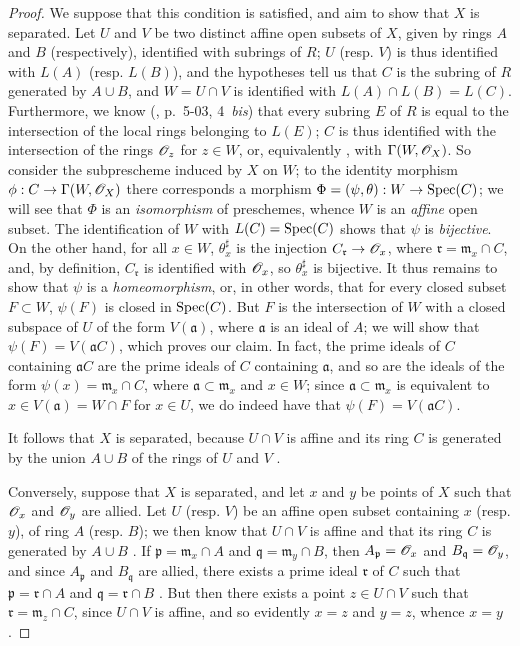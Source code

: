 \begin{proof}
\label{proof-I.8.2.2}
We suppose that this condition is satisfied, and aim to show that $X$ is separated.
Let $U$ and $V$ be two distinct affine open subsets of $X$, given by rings $A$ and $B$ (respectively), identified with subrings of $R$;
$U$ (resp. $V$) is thus identified  with $L(A)$ (resp. $L(B)$), and the hypotheses tell us  that $C$ is the subring of $R$ generated by $A\cup B$, and $W=U\cap V$ is identified with $L(A)\cap L(B)=L(C)$.
Furthermore, we know (\cite{I-1}, p.~5-03, 4~\emph{bis}) that every subring $E$ of $R$ is equal to the intersection of the local rings belonging to $L(E)$;
$C$ is thus identified with the intersection of the rings $\mathscr{O}_z$ for $z\in W$, or, equivalently , with $\Gamma(W,\mathscr{O}_X)$.
So consider the subprescheme induced by $X$ on $W$;
to the identity morphism $\vphi: C\to\Gamma(W,\sh{O}_X)$ there corresponds  a morphism $\Phi=(\psi,\theta):W\to\Spec(C)$;
we will see that $\Phi$ is an \emph{isomorphism} of preschemes, whence $W$ is an \emph{affine} open subset.
The identification of $W$ with $L(C)=\operatorname{Spec}(C)$ shows that $\psi$ is \emph{bijective}.
On the other hand, for all $x\in W$, $\theta_x^\sharp$ is the injection $C_\mathfrak{r}\to\sh{O}_x$, where $\mathfrak{r}=\mathfrak{m}_x\cap C$, and, by definition, $C_\mathfrak{r}$ is identified with $\mathscr{O}_x$, so $\theta_x^\sharp$ is bijective.
It thus remains to show that $\psi$ is a \emph{homeomorphism}, or, in other words, that for every closed subset $F\subset W$, $\psi(F)$ is closed in
$\operatorname{Spec}(C)$.
But $F$ is the intersection of $W$ with a closed subspace of $U$ of the form $V(\mathfrak{a})$, where $\mathfrak{a}$ is an ideal of $A$;
we will show that $\psi(F)=V(\mathfrak{a}C)$, which proves our claim.
In fact, the prime ideals of $C$ containing $\mathfrak{a}C$ are the prime ideals of $C$ containing $\mathfrak{a}$, and so are the ideals of the form $\psi(x)=\mathfrak{m}_x\cap C$, where $\mathfrak{a}\subset\mathfrak{m}_x$ and $x\in W$;
since $\mathfrak{a}\subset\mathfrak{m}_x$ is equivalent to $x\in V(\mathfrak{a})=W\cap F$ for $x\in U$, we do indeed have that $\psi(F)=V(\mathfrak{a}C)$.

It follows that $X$ is separated, because $U\cap V$ is affine and its ring $C$ is generated by the union $A\cup B$ of the rings of $U$ and $V$ .

Conversely, suppose that $X$ is separated, and let $x$ and $y$ be points of $X$ such that $\mathscr{O}_x$ and $\mathscr{O}_y$ are allied.
Let $U$ (resp. $V$) be an affine open subset containing $x$ (resp. $y$), of ring $A$ (resp. $B$);
we then know that $U\cap V$ is affine and that its ring $C$ is generated by $A\cup B$ .
If $\mathfrak{p}=\mathfrak{m}_x\cap A$ and $\mathfrak{q}=\mathfrak{m}_y\cap B$, then $A_\mathfrak{p}=\mathscr{O}_x$ and $B_\mathfrak{q}=\mathscr{O}_y$, and since $A_\mathfrak{p}$ and $B_\mathfrak{q}$ are allied, there exists a prime ideal $\mathfrak{r}$ of $C$ such that $\mathfrak{p}=\mathfrak{r}\cap A$ and $\mathfrak{q}=\mathfrak{r}\cap B$ .
But then there exists a point $z\in U\cap V$ such that $\mathfrak{r}=\mathfrak{m}_z\cap C$, since $U\cap V$ is affine, and so evidently $x=z$ and $y=z$, whence $x=y$.
\end{proof}

